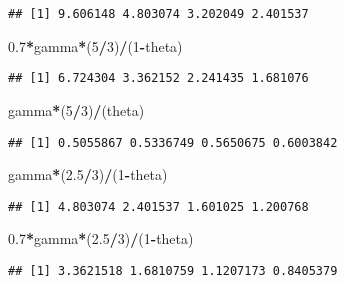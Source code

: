 \documentclass[
]{article}
\newenvironment{Shaded}{\begin{snugshade}}{\end{snugshade}}
\newcommand{\DecValTok}[1]{\textcolor[rgb]{0.00,0.00,0.81}{#1}}
\newcommand{\FloatTok}[1]{\textcolor[rgb]{0.00,0.00,0.81}{#1}}
\newcommand{\NormalTok}[1]{#1}
\newcommand{\OperatorTok}[1]{\textcolor[rgb]{0.81,0.36,0.00}{\textbf{#1}}}
\begin{document}
\begin{verbatim}
## [1] 9.606148 4.803074 3.202049 2.401537
\end{verbatim}

\begin{Shaded}
\begin{Highlighting}[]
\FloatTok{0.7}\OperatorTok{*}\NormalTok{gamma}\OperatorTok{*}\NormalTok{(}\DecValTok{5}\OperatorTok{/}\DecValTok{3}\NormalTok{)}\OperatorTok{/}\NormalTok{(}\DecValTok{1}\OperatorTok{-}\NormalTok{theta)}
\end{Highlighting}
\end{Shaded}

\begin{verbatim}
## [1] 6.724304 3.362152 2.241435 1.681076
\end{verbatim}

\begin{Shaded}
\begin{Highlighting}[]
\NormalTok{gamma}\OperatorTok{*}\NormalTok{(}\DecValTok{5}\OperatorTok{/}\DecValTok{3}\NormalTok{)}\OperatorTok{/}\NormalTok{(theta)}
\end{Highlighting}
\end{Shaded}

\begin{verbatim}
## [1] 0.5055867 0.5336749 0.5650675 0.6003842
\end{verbatim}

\begin{Shaded}
\begin{Highlighting}[]
\NormalTok{gamma}\OperatorTok{*}\NormalTok{(}\FloatTok{2.5}\OperatorTok{/}\DecValTok{3}\NormalTok{)}\OperatorTok{/}\NormalTok{(}\DecValTok{1}\OperatorTok{-}\NormalTok{theta)}
\end{Highlighting}
\end{Shaded}

\begin{verbatim}
## [1] 4.803074 2.401537 1.601025 1.200768
\end{verbatim}

\begin{Shaded}
\begin{Highlighting}[]
\FloatTok{0.7}\OperatorTok{*}\NormalTok{gamma}\OperatorTok{*}\NormalTok{(}\FloatTok{2.5}\OperatorTok{/}\DecValTok{3}\NormalTok{)}\OperatorTok{/}\NormalTok{(}\DecValTok{1}\OperatorTok{-}\NormalTok{theta)}
\end{Highlighting}
\end{Shaded}

\begin{verbatim}
## [1] 3.3621518 1.6810759 1.1207173 0.8405379
\end{verbatim}
\end{document}
